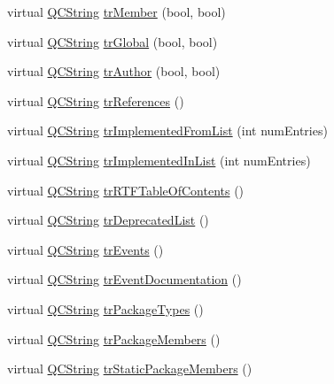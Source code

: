 \begin{DoxyCompactItemize}
\item 
virtual \hyperlink{class_q_c_string}{Q\-C\-String} \hyperlink{class_translator_chinesetraditional_a308d3e8064d956e84b92c240d1ff9ff0}{tr\-Member} (bool, bool)
\item 
virtual \hyperlink{class_q_c_string}{Q\-C\-String} \hyperlink{class_translator_chinesetraditional_a2e5701433502a83a5274a212db57fcbc}{tr\-Global} (bool, bool)
\item 
virtual \hyperlink{class_q_c_string}{Q\-C\-String} \hyperlink{class_translator_chinesetraditional_a4ce6b0c0cffcf6141ba8a989fe5a77d0}{tr\-Author} (bool, bool)
\item 
virtual \hyperlink{class_q_c_string}{Q\-C\-String} \hyperlink{class_translator_chinesetraditional_a54eaa9a933568bfd7eaffe36b7872eb0}{tr\-References} ()
\item 
virtual \hyperlink{class_q_c_string}{Q\-C\-String} \hyperlink{class_translator_chinesetraditional_a01f548ba9f63fd42bc070ba1247e6543}{tr\-Implemented\-From\-List} (int num\-Entries)
\item 
virtual \hyperlink{class_q_c_string}{Q\-C\-String} \hyperlink{class_translator_chinesetraditional_aa2aa7d2d195ce999a256e7769605c0f0}{tr\-Implemented\-In\-List} (int num\-Entries)
\item 
virtual \hyperlink{class_q_c_string}{Q\-C\-String} \hyperlink{class_translator_chinesetraditional_aacd8ff5b2dcf79f4e8e72625d624a206}{tr\-R\-T\-F\-Table\-Of\-Contents} ()
\item 
virtual \hyperlink{class_q_c_string}{Q\-C\-String} \hyperlink{class_translator_chinesetraditional_af7a7f1e3eaf6bc4c1026cfb73fbf486a}{tr\-Deprecated\-List} ()
\item 
virtual \hyperlink{class_q_c_string}{Q\-C\-String} \hyperlink{class_translator_chinesetraditional_a43ec7331f50b74dc31b6d4e13879c93a}{tr\-Events} ()
\item 
virtual \hyperlink{class_q_c_string}{Q\-C\-String} \hyperlink{class_translator_chinesetraditional_afb5c66237dd5bce42714ec9616a29887}{tr\-Event\-Documentation} ()
\item 
virtual \hyperlink{class_q_c_string}{Q\-C\-String} \hyperlink{class_translator_chinesetraditional_a835fa6d7f51082a0d730d4759cbc5999}{tr\-Package\-Types} ()
\item 
virtual \hyperlink{class_q_c_string}{Q\-C\-String} \hyperlink{class_translator_chinesetraditional_a595a1ba7b4f631a384b17e3c2084e271}{tr\-Package\-Members} ()
\item 
virtual \hyperlink{class_q_c_string}{Q\-C\-String} \hyperlink{class_translator_chinesetraditional_a8f144cf1daf28327dec2fe32c7fcb020}{tr\-Static\-Package\-Members} ()

\end{DoxyCompactItemize}
